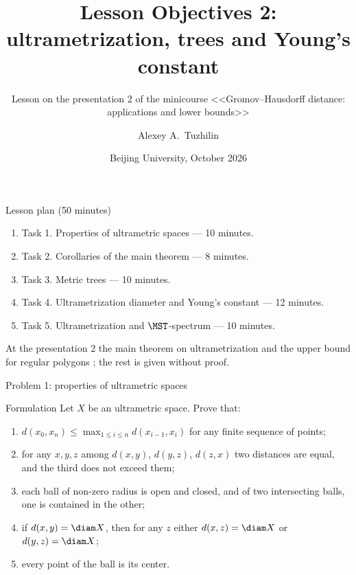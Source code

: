 \documentclass[aspectratio=169,11pt]{beamer}
\title[Lesson Objectives 2]{Lesson Objectives \textup{2}: ultrametrization, trees and Young's constant}
\subtitle{Lesson on the presentation \textup{2} of the minicourse <<Gromov--Hausdorff distance: applications and lower bounds>>}
\author{Alexey A.~Tuzhilin}
\date{Beijing University, October 2026}
\begin{document}
\begin{frame}
\titlepage
\end{frame}

\begin{frame}{Lesson plan (\textup{50} minutes)}
\begin{enumerate}
\item Task \textup{1}. Properties of ultrametric spaces --- \textup{10} minutes.
\item Task \textup{2}. Corollaries of the main theorem --- \textup{8} minutes.
\item Task \textup{3}. Metric trees --- \textup{10} minutes.
\item Task \textup{4}. Ultrametrization diameter and Young's constant --- \textup{12} minutes.
\item Task \textup{5}. Ultrametrization and $\MST$-spectrum --- \textup{10} minutes.
\end{enumerate}
\medskip
At the presentation \textup{2} the main theorem on ultrametrization and the upper bound for regular polygons \textup{;} the rest is given without proof.
\end{frame}

\begin{frame}{Problem \textup{1}: properties of ultrametric spaces}
\begin{block}{Formulation}
Let $X$ be an ultrametric space. Prove that\textup{:}
\begin{enumerate}
\item[(a)] $d(x_0,x_n) \le \max_{1\le i\le n} d(x_{i-1}, x_i)$ for any finite sequence of points\textup{;}
\item[(b)] for any $x,y,z$ among $d(x,y)$, $d(y,z)$, $d(z,x)$ two distances are equal, and the third does not exceed them\textup{;}
\item[(c)] each ball of non-zero radius is open and closed, and of two intersecting balls, one is contained in the other\textup{;}
\item[(d)] if $d(x,y) = \diam X$, then for any $z$ either $d(x,z) = \diam X$ or $d(y,z) = \diam X$\textup{;}
\item[(e)] every point of the ball is its center.
\end{enumerate}
\end{block}
\end{frame}
\end{document}
